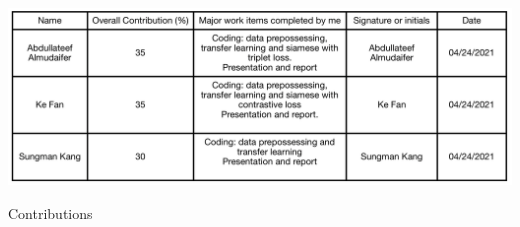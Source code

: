 \documentclass[sigconf]{acmart}
\begin{document}
\keywords{}

\begin{teaserfigure}
  \includegraphics[width=\textwidth]{figs/contribution.png}
  \caption{Contributions}
  \label{fig:contribution}
\end{teaserfigure}


\maketitle
















\end{document}
